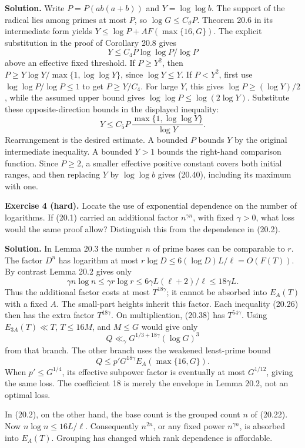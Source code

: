 \documentclass[
  11pt,
  a4paper,
]{article}
\begin{document}
\textbf{Solution.} Write \(P=P(ab(a+b))\) and \(Y=\log\log b\). The
support of the radical lies among primes at most \(P\), so
\(\log G\le C_\vartheta P\). Theorem 20.6 in its intermediate form
yields \(Y\le\log P+A F(\max\{16,G\})\). The explicit substitution in
the proof of Corollary 20.8 gives \[
 Y\le C_4P\log\log P/\log P
 \] above an effective fixed threshold. If \(P\ge Y^2\), then
\(P\ge Y\log Y/\max\{1,\log\log Y\}\), since \(\log Y\le Y\). If
\(P<Y^2\), first use \(\log\log P/\log P\le1\) to get \(P\ge Y/C_4\).
For large \(Y\), this gives \(\log P\ge(\log Y)/2\), while the assumed
upper bound gives \(\log\log P\le\log(2\log Y)\). Substitute these
opposite-direction bounds in the displayed inequality: \[
 Y\le C_5P\,
       \frac{\max\{1,\log\log Y\}}{\log Y}.
 \] Rearrangement is the desired estimate. A bounded \(P\) bounds \(Y\)
by the original intermediate inequality. A bounded \(Y>1\) bounds the
right-hand comparison function. Since \(P\ge2\), a smaller effective
positive constant covers both initial ranges, and then replacing \(Y\)
by \(\log\log b\) gives (20.40), including its maximum with one.

\textbf{Exercise 4 (hard).} Locate the use of exponential dependence on
the number of logarithms. If (20.1) carried an additional factor
\(n^{\gamma n}\), with fixed \(\gamma>0\), what loss would the same
proof allow? Distinguish this from the dependence in (20.2).

\textbf{Solution.} In Lemma 20.3 the number \(n\) of prime bases can be
comparable to \(r\). The factor \(D^n\) has logarithm at most
\(r\log D\le6(\log D)L/\ell=O(F(T))\). By contrast Lemma 20.2 gives only
\[
 \gamma n\log n\le\gamma r\log r
 \le6\gamma L(\ell+2)/\ell\le18\gamma L.
 \] Thus the additional factor costs at most \(T^{18\gamma}\); it cannot
be absorbed into \(E_A(T)\) with a fixed \(A\). The small-part heights
inherit this factor. Each inequality (20.26) then has the extra factor
\(T^{18\gamma}\). On multiplication, (20.38) has \(T^{54\gamma}\). Using
\(E_{3A}(T)\ll T\), \(T\le16M\), and \(M\le G\) would give only \[
 Q\ll_\gamma G^{1/3+18\gamma}(\log G)^3
 \] from that branch. The other branch uses the weakened least-prime
bound \[
 Q\le p'G^{18\gamma}E_A(\max\{16,G\}).
\] When \(p'\le G^{1/4}\), its effective subpower factor is eventually
at most \(G^{1/12}\), giving the same loss. The coefficient 18 is merely
the envelope in Lemma 20.2, not an optimal loss.

In (20.2), on the other hand, the base count is the grouped count \(n\)
of (20.22). Now \(n\log n\le16L/\ell\). Consequently \(n^{2n}\), or any
fixed power \(n^{\gamma n}\), is absorbed into \(E_A(T)\). Grouping has
changed which rank dependence is affordable.
\end{document}
